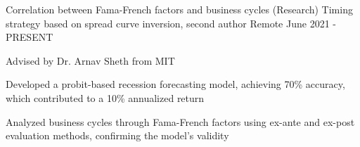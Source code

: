 \begin{cventries}
  \cventry
    {Correlation between Fama-French factors and business cycles}
    {(Research) Timing strategy based on spread curve inversion, second author}
    {Remote}
    {June 2021 - PRESENT}
    {
      \begin{cvitems}
        \item {Advised by Dr. Arnav Sheth from MIT}
        \item {Developed a probit-based recession forecasting model, achieving 70\% accuracy, which contributed to a 10\% annualized return}
        \item {Analyzed business cycles through Fama-French factors using ex-ante and ex-post evaluation methods, confirming the model's validity}
      \end{cvitems}
    }

  \begin{comment}
  \cventry
  {Full-stack development for an event-driven quantitative trading simulation}
  {Quantitative trading PaaS}
  {Remote}
  {Sep. 2020 - PRESENT}
  {
    \begin{cvitems}
      \item {Implemented benchmark tools based upon ARIMA and Prophet}
      \item {Designed UI\&UX with quantified alpha/beta testing, improving user experience}
      \item {Proposed low latency APIs that allow high frequency trading via HTTP}
    \end{cvitems}
  }
  
  \cventry
    {(Internship)Project manager \& developer for a change detection model on VHR satellite pictures}
    {Shunzhi Tech Inc.}
    {Nanjing, China}
    {Jun. 2020 - Sep. 2020}
    {
      \begin{cvitems}
        \item {Implemented real-time video stream object detection framework with 34\% improvement than benchmark}
        \item {Deployed results to heterogeneous computing units from multiple service providers, saving 20\% cost}
      \end{cvitems}
    }


\end{comment}
\end{cventries}
